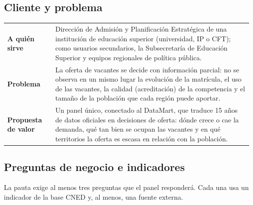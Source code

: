 \documentclass[11pt,a4paper]{article}
\begin{document}
\subsection{Cliente y problema}
\begin{tabularx}{\textwidth}{@{}>{\bfseries}p{3.4cm}Y@{}}
\toprule
A qui\'en sirve & Direcci\'on de Admisi\'on y Planificaci\'on Estrat\'egica de una instituci\'on de educaci\'on superior (universidad, IP o CFT); como usuarios secundarios, la Subsecretar\'ia de Educaci\'on Superior y equipos regionales de pol\'itica p\'ublica. \\
Problema & La oferta de vacantes se decide con informaci\'on parcial: no se observa en un mismo lugar la evoluci\'on de la matr\'icula, el uso de las vacantes, la calidad (acreditaci\'on) de la competencia y el tama\~no de la poblaci\'on que cada regi\'on puede aportar. \\
Propuesta de valor & Un panel \'unico, conectado al DataMart, que traduce 15 a\~nos de datos oficiales en decisiones de oferta: d\'onde crece o cae la demanda, qu\'e tan bien se ocupan las vacantes y en qu\'e territorios la oferta es escasa en relaci\'on con la poblaci\'on. \\
\bottomrule
\end{tabularx}

\subsection{Preguntas de negocio e indicadores}\label{sec:preguntas}
La pauta exige al menos tres preguntas que el panel responder\'a. Cada una usa un indicador de la base CNED y, al menos, una fuente externa.
\end{document}
